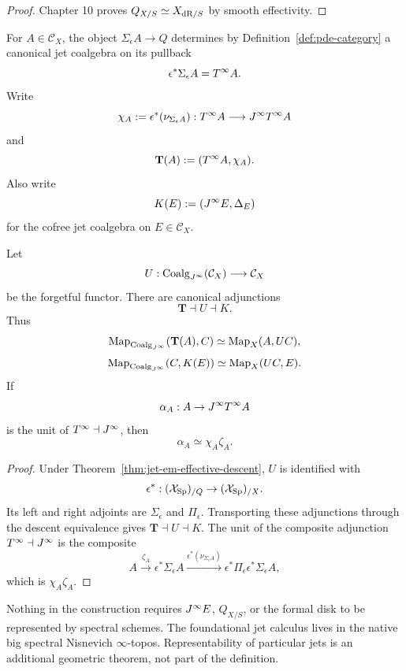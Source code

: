 \begin{proof}
Chapter 10 proves $Q_{X/S}\simeq X_{\mathrm{dR}/S}$ by smooth effectivity.
\end{proof}

\begin{construction}
\label{con:formal-disk-coalgebra}
For $A\in\mathcal C_X$, the object $\Sigma_\epsilon A\to Q$ determines by Definition~\ref{def:pde-category} a canonical jet coalgebra on its pullback
\[
    \epsilon^*\Sigma_\epsilon A=T^{\infty} A.
\]
Write
\[
    \chi_A
    :=
    \epsilon^*(\nu_{\Sigma_\epsilon A}):
    T^{\infty} A\longrightarrow J^{\infty}T^{\infty} A
\]
and
\[
    \mathbf T(A):=(T^{\infty} A,\chi_A).
\]
Also write
\[
    K(E):=(J^{\infty} E,\Delta_E)
\]
for the cofree jet coalgebra on $E\in\mathcal C_X$.
\end{construction}

\begin{theorem}
\label{thm:disk-coalgebra-adjunctions}
Let
\[
    U:\operatorname{Coalg}_{J^{\infty}}(\mathcal C_X)\longrightarrow\mathcal C_X
\]
be the forgetful functor.  There are canonical adjunctions
\[
    \boxed{\mathbf T\dashv U\dashv K.}
\]
Thus
\[
    \operatorname{Map}_{\operatorname{Coalg}_{J^{\infty}}}(\mathbf T(A),C)
    \simeq
    \operatorname{Map}_X(A,UC),
\]
\[
    \operatorname{Map}_{\operatorname{Coalg}_{J^{\infty}}}(C,K(E))
    \simeq
    \operatorname{Map}_X(UC,E).
\]
If
\[
    \alpha_A:A\to J^{\infty}T^{\infty} A
\]
is the unit of $T^{\infty}\dashv J^{\infty}$, then
\[
    \boxed{\alpha_A\simeq\chi_A\zeta_A.}
\]
\end{theorem}

\begin{proof}
Under Theorem~\ref{thm:jet-em-effective-descent}, $U$ is identified with
\[
    \epsilon^*:(\mathcal{X}_{\mathrm{Sp}})_{/Q}\to(\mathcal{X}_{\mathrm{Sp}})_{/X}.
\]
Its left and right adjoints are $\Sigma_\epsilon$ and $\Pi_\epsilon$.  Transporting these adjunctions through the descent equivalence gives $\mathbf T\dashv U\dashv K$.  The unit of the composite adjunction $T^{\infty}\dashv J^{\infty}$ is the composite
\[
    A\xrightarrow{\zeta_A}
    \epsilon^*\Sigma_\epsilon A
    \xrightarrow{\epsilon^*(\nu_{\Sigma_\epsilon A})}
    \epsilon^*\Pi_\epsilon\epsilon^*\Sigma_\epsilon A,
\]
which is $\chi_A\zeta_A$.
\end{proof}

\begin{remark}[Representability]
Nothing in the construction requires $J^{\infty} E$, $Q_{X/S}$, or the formal disk to be represented by spectral schemes.  The foundational jet calculus lives in the native big spectral Nisnevich $\infty$-topos.  Representability of particular jets is an additional geometric theorem, not part of the definition.
\end{remark}

